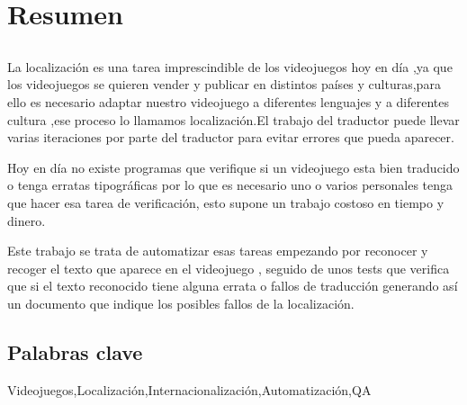 \chapter*{Resumen}

\section*{\tituloPortadaVal}

La localización es una tarea imprescindible de los videojuegos hoy en día ,ya que los videojuegos se quieren vender y publicar en distintos países y culturas,para ello es necesario adaptar nuestro videojuego a diferentes lenguajes y a diferentes cultura ,ese proceso lo llamamos localización.El trabajo del traductor puede llevar varias iteraciones por parte del traductor para evitar errores que pueda aparecer.

Hoy en día no existe programas que verifique si un videojuego esta bien traducido o tenga erratas tipográficas por lo que es necesario uno o varios personales tenga que hacer esa tarea de verificación, esto supone un trabajo costoso en tiempo y dinero.

Este trabajo se trata de automatizar esas tareas empezando por reconocer y recoger el texto que aparece en el videojuego , seguido de unos tests que verifica que si el texto reconocido tiene alguna errata o fallos de traducción generando así un documento que indique los posibles fallos de la localización.



\section*{Palabras clave}
   
\noindent Videojuegos,Localización,Internacionalización,Automatización,QA

   


